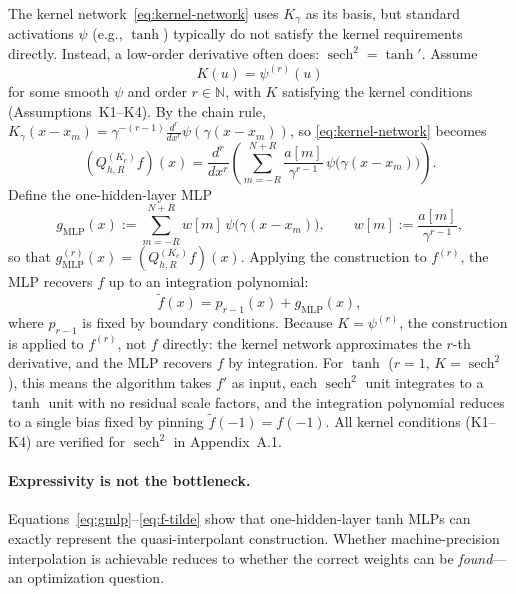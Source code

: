 \documentclass{article}
\begin{document}
The kernel network~\eqref{eq:kernel-network} uses \(K_\gamma\) as its basis, but standard activations \(\psi\) (e.g., \(\tanh\)) typically do not satisfy the kernel requirements directly.  Instead, a low-order derivative often does: \(\operatorname{sech}^2 = \tanh'\).  Assume
\begin{equation}
  K(u) = \psi^{(r)}(u)
  \label{eq:activation-kernel}
\end{equation}
for some smooth \(\psi\) and order \(r\in\mathbb{N}\), with \(K\) satisfying the kernel conditions (Assumptions~K1--K4).  By the chain rule, \(K_\gamma(x - x_m) = \gamma^{-(r-1)}\frac{d^r}{dx^r}\psi(\gamma(x-x_m))\), so \eqref{eq:kernel-network} becomes
\begin{equation}
  (Q_{h,R}^{(K_c)} f)(x)
  = \frac{d^r}{dx^r}\!\left(
      \sum_{m=-R}^{N+R} \frac{a[m]}{\gamma^{r-1}}\,\psi\big(\gamma(x-x_m)\big)
    \right).
  \label{eq:derivative-form}
\end{equation}
Define the one-hidden-layer MLP
\begin{equation}
  g_{\mathrm{MLP}}(x) := \sum_{m=-R}^{N+R} w[m]\,\psi\big(\gamma(x-x_m)\big),
  \qquad
  w[m] := \frac{a[m]}{\gamma^{r-1}},
  \label{eq:gmlp}
\end{equation}
so that \(g_{\mathrm{MLP}}^{(r)}(x) = (Q_{h,R}^{(K_c)} f)(x)\).  Applying the construction to \(f^{(r)}\), the MLP recovers \(f\) up to an integration polynomial:
\begin{equation}
  \widetilde{f}(x) = p_{r-1}(x) + g_{\mathrm{MLP}}(x),
  \label{eq:f-tilde}
\end{equation}
where \(p_{r-1}\) is fixed by boundary conditions.  Because \(K = \psi^{(r)}\), the construction is applied to \(f^{(r)}\), not \(f\) directly: the kernel network approximates the \(r\)-th derivative, and the MLP recovers \(f\) by integration.  For \(\tanh\) (\(r = 1\), \(K = \operatorname{sech}^2\)), this means the algorithm takes \(f'\) as input, each \(\operatorname{sech}^2\) unit integrates to a \(\tanh\) unit with no residual scale factors, and the integration polynomial reduces to a single bias fixed by pinning \(\widetilde{f}(-1) = f(-1)\).  All kernel conditions (K1--K4) are verified for \(\operatorname{sech}^2\) in Appendix~A.1.

\paragraph{Expressivity is not the bottleneck.}
Equations~\eqref{eq:gmlp}--\eqref{eq:f-tilde} show that one-hidden-layer tanh MLPs can exactly represent the quasi-interpolant construction.  Whether machine-precision interpolation is achievable reduces to whether the correct weights can be \emph{found}---an optimization question.
\end{document}
